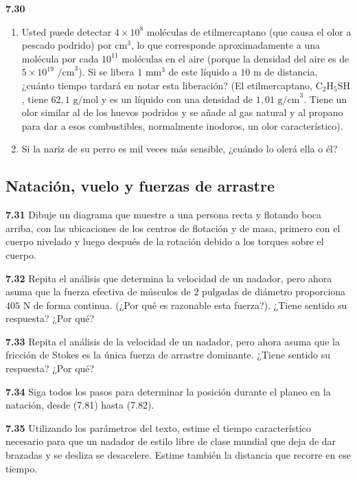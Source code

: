 \documentclass[12pt]{book}
\begin{document}
\textbf{7.30}
\begin{enumerate}
  \item[(a)] Usted puede detectar $4 \times 10^8\text{ moléculas}$ de etilmercaptano (que causa el olor a pescado podrido) por $\text{cm}^3$, lo que corresponde aproximadamente a una molécula por cada $10^{11}\text{ moléculas}$ en el aire (porque la densidad del aire es de $5 \times 10^{19}\text{ /cm}^3$). Si se libera $1\text{ mm}^3$ de este líquido a $10\text{ m}$ de distancia, ¿cuánto tiempo tardará en notar esta liberación? (El etilmercaptano, $\text{C}_2\text{H}_5\text{SH}$, tiene $62{,}1\text{ g/mol}$ y es un líquido con una densidad de $1{,}01\text{ g/cm}^3$. Tiene un olor similar al de los huevos podridos y se añade al gas natural y al propano para dar a esos combustibles, normalmente inodoros, un olor característico).
  \item[(b)] Si la nariz de su perro es mil veces más sensible, ¿cuándo lo olerá ella o él?
\end{enumerate}

\subsection*{Natación, vuelo y fuerzas de arrastre}

\textbf{7.31} Dibuje un diagrama que muestre a una persona recta y flotando boca arriba, con las ubicaciones de los centros de flotación y de masa, primero con el cuerpo nivelado y luego después de la rotación debido a los torques sobre el cuerpo.

\textbf{7.32} Repita el análisis que determina la velocidad de un nadador, pero ahora asuma que la fuerza efectiva de músculos de $2\text{ pulgadas}$ de diámetro proporciona $405\text{ N}$ de forma continua. (¿Por qué es razonable esta fuerza?). ¿Tiene sentido su respuesta? ¿Por qué?

\textbf{7.33} Repita el análisis de la velocidad de un nadador, pero ahora asuma que la fricción de Stokes es la única fuerza de arrastre dominante. ¿Tiene sentido su respuesta? ¿Por qué?

\textbf{7.34} Siga todos los pasos para determinar la posición durante el planeo en la natación, desde (7.81) hasta (7.82).

\textbf{7.35} Utilizando los parámetros del texto, estime el tiempo característico necesario para que un nadador de estilo libre de clase mundial que deja de dar brazadas y se desliza se desacelere. Estime también la distancia que recorre en ese tiempo.
\end{document}
